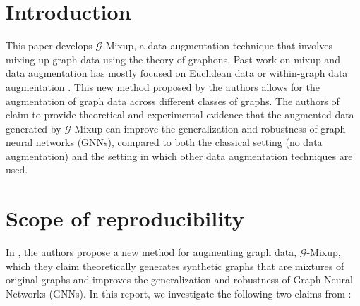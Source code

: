 \section{Introduction}

This paper \cite{Han:2022} develops $\mathcal{G}$-Mixup, a data augmentation technique that involves mixing up graph data using the theory of graphons. Past work on mixup and data augmentation has mostly focused on Euclidean data \cite{Zhang:2018} or within-graph data augmentation \cites{Rong:2020,You:2020}. This new method proposed by the authors allows for the augmentation of graph data across different classes of graphs. The authors of \cite{Han:2022} claim to provide theoretical and experimental evidence that the augmented data generated by $\mathcal{G}$-Mixup can improve the generalization and robustness of graph neural networks (GNNs), compared to both the classical setting (no data augmentation) and the setting in which other data augmentation techniques are used.



\section{Scope of reproducibility}
\label{sec:claims}


In \cite{Han:2022}, the authors propose a new method for augmenting graph data, $\mathcal{G}$-Mixup, which they claim theoretically generates synthetic graphs that are mixtures of original graphs and improves the generalization and robustness of Graph Neural Networks (GNNs). In this report, we investigate the following two claims from \cite{Han:2022}:

